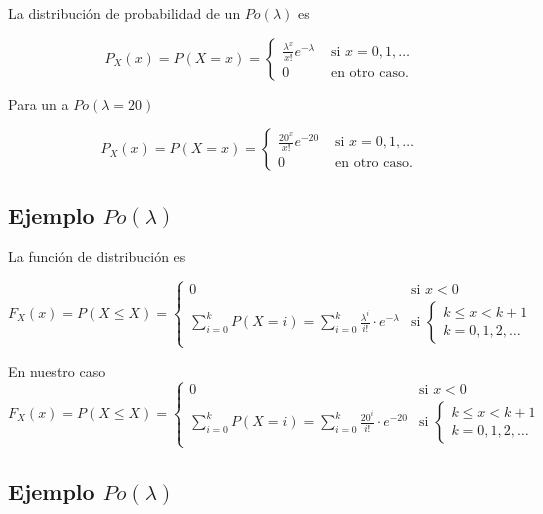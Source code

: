 \documentclass[]{book}
\begin{document}
La distribución de probabilidad de un \(Po(\lambda)\) es

\[
P_X(x)=P(X=x)=\left\{\begin{array}{ll}  \frac{\lambda^x}{x!}e^{-\lambda} & \mbox{ si } x=0,1,\ldots\\ 0  & \mbox{ en otro caso.}\end{array}\right.
\]

Para un a \(Po(\lambda=20)\)

\[
P_X(x)=P(X=x)=\left\{\begin{array}{ll}\frac{20^x}{x!}e^{-20} & \mbox{ si } x=0,1,\ldots\\ 0  & \mbox{ en otro caso.}\end{array}\right.
\]

\hypertarget{ejemplo-polambda-3}{%
\subsection{\texorpdfstring{Ejemplo \(Po(\lambda)\)}{Ejemplo Po(\textbackslash{}lambda)}}\label{ejemplo-polambda-3}}

La función de distribución es

\[
F_X(x)=P(X\leq X)=
\left\{\begin{array}{ll} 
0 & \mbox{si } x<0\\
\displaystyle\sum_{i=0}^{k} P(X=i)=\sum_{i=0}^{k}\frac{\lambda^i}{i!}\cdot e^{-\lambda} & \mbox{si  }
\left\{\begin{array}{l}
k\leq x< k+1\\k=0,1,2,\ldots
\end{array}
\right.
\end{array}
\right.
\]

En nuestro caso
\[
F_X(x)=P(X\leq X)=
\left\{\begin{array}{ll} 
0 & \mbox{si } x<0\\
\displaystyle\sum_{i=0}^{k} P(X=i)=\sum_{i=0}^{k}\frac{20^i}{i!}\cdot e^{-20} & \mbox{si  }
\left\{\begin{array}{l}
k\leq x< k+1\\k=0,1,2,\ldots
\end{array}
\right.
\end{array}
\right.
\]

\hypertarget{ejemplo-polambda-4}{%
\subsection{\texorpdfstring{Ejemplo \(Po(\lambda)\)}{Ejemplo Po(\textbackslash{}lambda)}}\label{ejemplo-polambda-4}}
\end{document}
